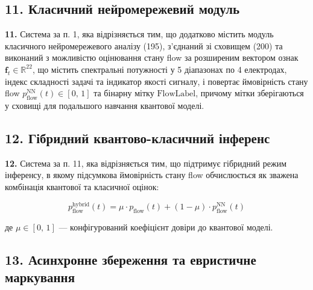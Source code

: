 \documentclass[12pt,a4paper]{article}
\begin{document}
\subsection{11. Класичний нейромережевий модуль}\label{ux43aux43bux430ux441ux438ux447ux43dux438ux439-ux43dux435ux439ux440ux43eux43cux435ux440ux435ux436ux435ux432ux438ux439-ux43cux43eux434ux443ux43bux44c}



\textbf{11.} Система за п. 1, яка відрізняється тим, що додатково містить модуль класичного нейромережевого аналізу (195), з'єднаний зі сховищем (200) та виконаний з можливістю оцінювання стану flow за розширеним вектором ознак \(\mathbf{f}_t \in \mathbb{R}^{22}\), що містить спектральні потужності у 5 діапазонах по 4 електродах, індекс складності задачі та індикатор якості сигналу, і повертає ймовірність стану flow \(p_{\text{flow}}^{\text{NN}}(t) \in [0,\,1]\) та бінарну мітку \(\text{FlowLabel}\), причому мітки зберігаються у сховищі для подальшого навчання квантової моделі.



\subsection{12. Гібридний квантово-класичний інференс}\label{ux433ux456ux431ux440ux438ux434ux43dux438ux439-ux43aux432ux430ux43dux442ux43eux432ux43e-ux43aux43bux430ux441ux438ux447ux43dux438ux439-ux456ux43dux444ux435ux440ux435ux43dux441}



\textbf{12.} Система за п. 11, яка відрізняється тим, що підтримує гібридний режим інференсу, в якому підсумкова ймовірність стану flow обчислюється як зважена комбінація квантової та класичної оцінок:



\[p_{\text{flow}}^{\text{hybrid}}(t) = \mu \cdot p_{\text{flow}}(t) + (1 - \mu) \cdot p_{\text{flow}}^{\text{NN}}(t)\]



де \(\mu \in [0,\,1]\) --- конфігурований коефіцієнт довіри до квантової моделі.



\subsection{13. Асинхронне збереження та евристичне маркування}\label{ux430ux441ux438ux43dux445ux440ux43eux43dux43dux435-ux437ux431ux435ux440ux435ux436ux435ux43dux43dux44f-ux442ux430-ux435ux432ux440ux438ux441ux442ux438ux447ux43dux435-ux43cux430ux440ux43aux443ux432ux430ux43dux43dux44f}
\end{document}
